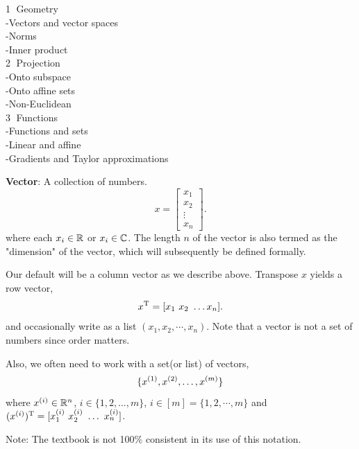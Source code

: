 
\noindent\textcircled{1} Geometry\\
-Vectors and vector spaces\\
-Norms\\
-Inner product\\

\noindent\textcircled{2} Projection\\
-Onto subspace\\
-Onto affine sets\\
-Non-Euclidean\\

\noindent\textcircled{3} Functions\\
-Functions and sets\\
-Linear and affine\\
-Gradients and Taylor approximations\\

\newpage

\noindent\textbf{Vector}: A collection of numbers.
\begin{equation*}
x = \left[ \begin{array}{c} x_1 \\ x_2 \\ \vdots \\ x_n\end{array} \right].
\end{equation*}
where each $x_i \in \mathbb{R}$ or $x_i \in \mathbb{C}$. The length $n$ of the vector is also termed as the "dimension" of the vector, which will subsequently be defined formally.

Our default will be a column vector as we describe above. Transpose $x$ yields a row vector,   
\begin{equation*}
x^{\rm T} = [ x_1 \ x_2 \ \ldots x_n].
\end{equation*}
and occasionally write as a list $(x_{1}, x_{2},\cdots,x_{n})$.  Note that a vector is not a set of numbers since order matters.

Also, we often need to work with a set(or list) of vectors,
\begin{equation*}
\{ x^{(1)}_{}, x^{(2)}_{}, \ldots, x^{(m)}_{}\}
\end{equation*}
where $x^{(i)}_{} \in \mathbb{R}^n$, $i \in \{1, 2, \ldots, m\}$, $i \in [m] = \{1,2,\cdots,m\}$ and
$(\vecx{i})^\trans = [ \vecx[1]{i} \ \vecx[2]{i} \ \ldots \ \vecx[n]{i} ]$.  

Note: The textbook is not 100\% consistent in its use of this notation.

